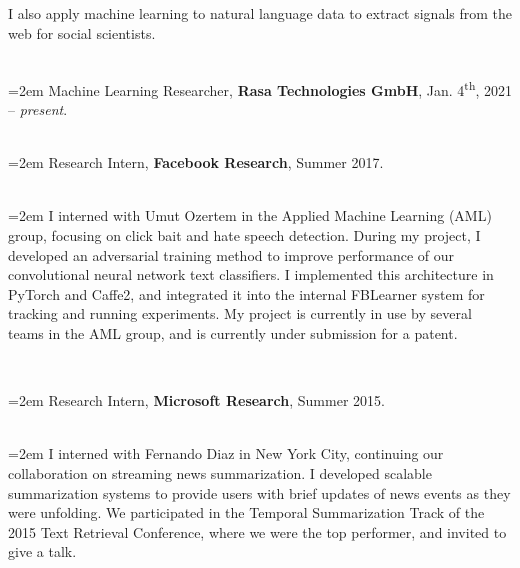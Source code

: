 \documentclass{scrartcl}
\newcommand{\MarginSection}[1]{\marginpar{#1}}
\newcommand{\NewEntry}[2]{\noindent\hangindent=0em\hangafter=0 \parbox{4em}{\small #1} #2 
\vspace{0.35em}} %
\begin{document}
\begin{cv}{}
\noindent I also apply machine learning to natural language data to extract signals from the web for social scientists.

~\\

\MarginSection{~\\Research\\Experience}
\noindent\hangindent=2em Machine Learning Researcher, \textbf{Rasa Technologies GmbH}, Jan. 4\textsuperscript{th}, 2021 -- \textit{present}.\\

{~\vspace{-1.25em}\\}


\noindent\hangindent=2em Research Intern, \textbf{Facebook Research}, Summer 2017.\\

{~\vspace{-3.5em}\\}

\noindent\hangindent=2em I interned with Umut Ozertem in the 
Applied Machine Learning (AML) group, focusing on click bait and hate speech 
detection.
During my project, I developed an adversarial training method to improve 
performance of our convolutional neural network text classifiers.
I implemented this architecture in PyTorch and Caffe2, and integrated it into
the internal FBLearner system for tracking and running experiments.
My project is currently in use by several teams in the AML group, and is currently under submission for a patent.

{~\vspace{-1.5em}\\}

\noindent\hangindent=2em Research Intern, \textbf{Microsoft Research}, Summer 2015.\\

{~\vspace{-3.5em}\\}

\noindent\hangindent=2em I interned with Fernando Diaz in 
    New York City, continuing our collaboration on streaming 
    news summarization. I developed scalable summarization systems 
    to provide users with brief updates of news events as they were unfolding. 
    We participated in the Temporal Summarization Track of the 2015
    Text Retrieval Conference, where we were the top performer, and invited
to give a talk.




\end{cv}
\end{document}
